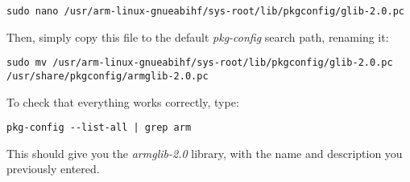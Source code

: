 \documentclass[a4paper,11pt]{article}
\begin{document}
\begin{lstlisting}
sudo nano /usr/arm-linux-gnueabihf/sys-root/lib/pkgconfig/glib-2.0.pc
\end{lstlisting}

Then, simply copy this file to the default \emph{pkg-config} search path, renaming it:

\begin{lstlisting}[]
sudo mv /usr/arm-linux-gnueabihf/sys-root/lib/pkgconfig/glib-2.0.pc /usr/share/pkgconfig/armglib-2.0.pc
\end{lstlisting}

To check that everything works correctly, type:

\begin{lstlisting}[]
pkg-config --list-all | grep arm
\end{lstlisting}

This should give you the \emph{armglib-2.0} library, with the name and description you previously entered.
\end{document}
